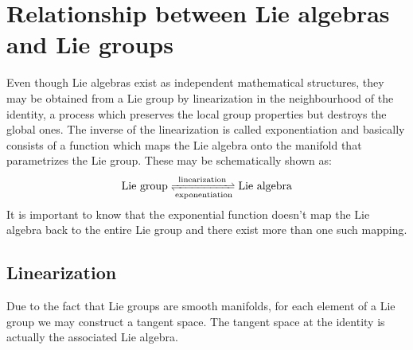 \documentclass[12pt,a4paper]{report}
\theoremstyle{definition}
\theoremstyle{remark}
\theoremstyle{remark}
\begin{document}
\section{Relationship between Lie algebras and Lie groups}
Even though Lie algebras exist as independent mathematical structures, they may be obtained from a Lie group by linearization in the neighbourhood of the identity, a process which preserves the local group properties but destroys the global ones. The inverse of the linearization is called exponentiation and basically consists of a function which maps the Lie algebra onto the manifold that parametrizes the Lie group. These may be schematically shown as:
\begin{align*}
\text{Lie group}\xrightleftharpoons[\text{exponentiation}]{\,\text{linearization}\,}\text{Lie algebra}
\end{align*}
\indent It is important to know that the exponential function doesn't map the Lie algebra back to the entire Lie group and there exist more than one such mapping. 

\subsection{Linearization}
Due to the fact that Lie groups are smooth manifolds, for each element of a Lie group we may construct a tangent space. The tangent space at the identity is actually the associated Lie algebra.
\end{document}
